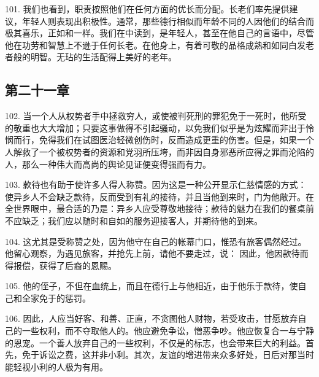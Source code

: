 101. 我们也看到，职责按照他们在任何方面的优长而分配。长老们率先提供建议，年轻人则表现出积极性。通常，那些德行相似而年龄不同的人因他们的结合而极其喜乐，正如和一样。我们在中读到，是年轻人，甚至在他自己的言语中，尽管他在功劳和智慧上不逊于任何长老。在他身上，有着可敬的品格成熟和如同白发老者般的明智。无玷的生活配得上美好的老年。\par


\subsection{第二十一章}

\par

102. 当一个人从权势者手中拯救穷人，或使被判死刑的罪犯免于一死时，他所受的敬重也大大增加；只要这事做得不引起骚动，以免我们似乎是为炫耀而非出于怜悯而行，免得我们在试图医治轻微创伤时，反而造成更重的伤害。但是，如果一个人解救了一个被权势者的资源和党羽所压垮，而非因自身邪恶所应得之罪而沦陷的人，那么一种伟大而高尚的舆论见证便变得强而有力。\par

103. 款待也有助于使许多人得人称赞。因为这是一种公开显示仁慈情感的方式：使异乡人不会缺乏款待，反而受到有礼的接待，并且当他到来时，门为他敞开。在全世界眼中，最合适的乃是：异乡人应受尊敬地接待；款待的魅力在我们的餐桌前不应缺乏；我们应以随时和自如的服务迎接客人，并期待他的到来。\par

104. 这尤其是受称赞之处，因为他守在自己的帐幕门口，惟恐有旅客偶然经过。他留心观察，为遇见旅客，并抢先上前，请他不要走过，说：  因此，他因款待而得报偿，获得了后裔的恩赐。\par

105. 他的侄子，不但在血统上，而且在德行上与他相近，由于他乐于款待，使自己和全家免于的惩罚。\par

106. 因此，人应当好客、和善、正直，不贪图他人财物，若受攻击，甘愿放弃自己的一些权利，而不夺取他人的。他应避免争讼，憎恶争吵。他应恢复合一与宁静的恩宠。一个善人放弃自己的一些权利，不仅是的标志，也会带来巨大的利益。首先，免于诉讼之费，这并非小利。其次，友谊的增进带来众多好处，日后对那当时能轻视小利的人极为有用。\par

